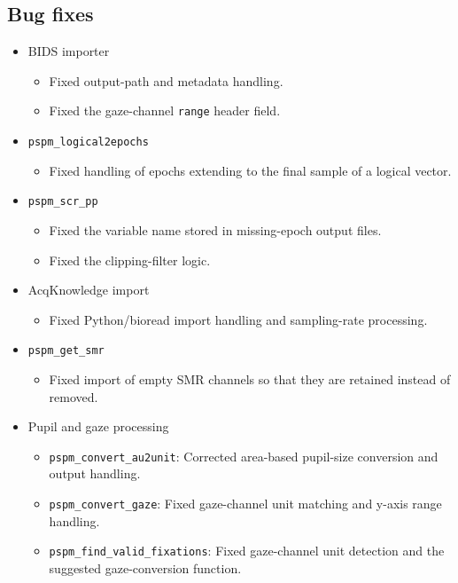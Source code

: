 \documentclass[english]{article}
\numberwithin{equation}{section}
\numberwithin{figure}{section}
\begin{document}
\subsection*{Bug fixes}
\begin{itemize}

\item BIDS importer
\begin{itemize}
\item Fixed output-path and metadata handling.
\item Fixed the gaze-channel \texttt{range} header field.
\end{itemize}

\item \texttt{pspm\_logical2epochs}
\begin{itemize}
\item Fixed handling of epochs extending to the final sample of a logical vector.
\end{itemize}

\item \texttt{pspm\_scr\_pp}
\begin{itemize}
\item Fixed the variable name stored in missing-epoch output files.
\item Fixed the clipping-filter logic.
\end{itemize}

\item AcqKnowledge import
\begin{itemize}
\item Fixed Python/bioread import handling and sampling-rate processing.
\end{itemize}

\item \texttt{pspm\_get\_smr}
\begin{itemize}
\item Fixed import of empty SMR channels so that they are retained instead of removed.
\end{itemize}

\item Pupil and gaze processing
\begin{itemize}
\item \texttt{pspm\_convert\_au2unit}: Corrected area-based pupil-size conversion and output handling.
\item \texttt{pspm\_convert\_gaze}: Fixed gaze-channel unit matching and y-axis range handling.
\item \texttt{pspm\_find\_valid\_fixations}: Fixed gaze-channel unit detection and the suggested gaze-conversion function.
\end{itemize}


\end{itemize}
\end{document}
